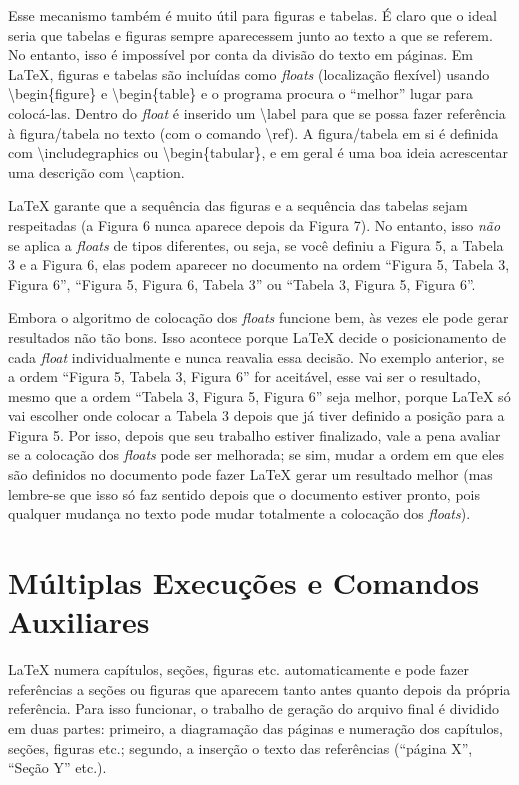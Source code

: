Esse mecanismo também é muito útil para figuras e tabelas.
É claro que o ideal seria que tabelas e figuras sempre aparecessem junto ao
texto a que se referem. No entanto, isso é impossível por conta da divisão
do texto em páginas. Em \LaTeX{}, figuras e tabelas são incluídas como
\emph{floats} (localização flexível) usando \textsf{\textbackslash{}begin\{figure\}}
e \textsf{\textbackslash{}begin\{table\}} e o programa procura o ``melhor''
lugar para colocá-las. Dentro do \emph{float} é inserido um
\textsf{\textbackslash{}label} para que se possa fazer referência à figura/tabela
no texto (com o comando \textsf{\textbackslash{}ref}). A figura/tabela em
si é definida com \textsf{\textbackslash{}includegraphics} ou
\textsf{\textbackslash{}begin\{tabular\}}, e em geral é uma boa ideia acrescentar
uma descrição com \textsf{\textbackslash{}caption}.

\LaTeX{} garante que a sequência das figuras e a
sequência das tabelas sejam respeitadas (a Figura 6 nunca aparece depois da
Figura 7). No entanto, isso \emph{não} se aplica a \emph{floats} de tipos
diferentes, ou seja, se você definiu a Figura 5, a Tabela 3 e a Figura 6,
elas podem aparecer no documento na ordem ``Figura 5, Tabela 3, Figura 6'',
``Figura 5, Figura 6, Tabela 3'' ou ``Tabela 3, Figura 5, Figura 6''.

Embora o algoritmo de colocação dos \emph{floats} funcione bem, às vezes
ele pode gerar resultados não tão bons. Isso acontece porque \LaTeX{} decide
o posicionamento de cada \emph{float} individualmente e nunca reavalia essa
decisão. No exemplo anterior, se a ordem ``Figura 5, Tabela 3, Figura
6'' for aceitável, esse vai ser o resultado, mesmo que a ordem ``Tabela 3,
Figura 5, Figura 6'' seja melhor, porque \LaTeX{} só vai escolher onde
colocar a Tabela 3 depois que já tiver definido a posição para a Figura 5.
Por isso, depois que seu trabalho estiver finalizado, vale a pena avaliar
se a colocação dos \emph{floats} pode ser melhorada; se sim, mudar a ordem
em que eles são definidos no documento pode fazer \LaTeX{} gerar um
resultado melhor (mas lembre-se que isso só faz sentido depois que o
documento estiver pronto, pois qualquer mudança no texto pode mudar
totalmente a colocação dos \emph{floats}).

\section{Múltiplas Execuções e Comandos Auxiliares}

\LaTeX{} numera capítulos, seções, figuras etc. automaticamente
e pode fazer referências a seções ou figuras que aparecem tanto antes
quanto depois da própria referência. Para isso funcionar, o trabalho de
geração do arquivo final é dividido em duas partes: primeiro, a diagramação
das páginas e numeração dos capítulos, seções, figuras etc.; segundo, a
inserção o texto das referências (``página X'', ``Seção Y'' etc.).

